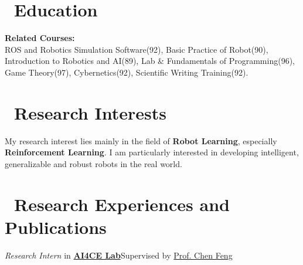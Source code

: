 \documentclass{resume}
\begin{document}



\section{\faGraduationCap\ Education}
    \textbf{Related Courses:} \\ROS and Robotics Simulation Software(92), Basic  Practice of Robot(90), Introduction to Robotics and AI(89), Lab \& Fundamentals of Programming(96), Game Theory(97), Cybernetics(92), Scientific Writing Training(92).

\section{\faBook\ Research Interests}
    \qquad My research interest lies mainly in the field of \textbf{Robot Learning}, especially \textbf{Reinforcement Learning}. I am particularly interested in developing intelligent, generalizable and robust robots in the real world. 


\section{\faUsers\ Research Experiences and Publications}
    \textit{Research Intern} {in \href{https://ai4ce.github.io/}{\textbf{AI4CE Lab}}\hfill Supervised by \href{https://scholar.google.com/citations?user=YeG8ZM0AAAAJ&hl=en}{Prof. Chen Feng}}
\end{document}
